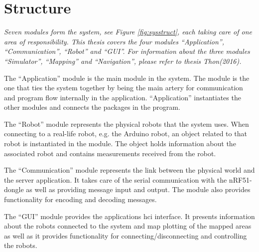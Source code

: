 \section{Structure}
\label{secr:structure}
\textit{Seven modules form the system, see Figure \ref{fig:sysstruct}, each taking care of one area of responsibility. This thesis covers the four modules ``Application'', ``Communication'', ``Robot'' and ``GUI''. For information about the three modules ``Simulator'', ``Mapping'' and ``Navigation'', please refer to thesis Thon(2016).}

The ``Application'' module is the main module in the system. The module is the one that ties the system together by being the main artery for communication and program flow internally in the application. ``Application'' instantiates the other modules and connects the packages in the program.

The ``Robot'' module represents the physical robots that the system uses. When connecting to a real-life robot, e.g. the Arduino robot, an object related to that robot is instantiated in the module. The object holds information about the associated robot and contains measurements received from the robot.

The ``Communication'' module represents the link between the physical world and the server application. It takes care of the serial communication with the nRF51-dongle as well as providing message input and output. The module also provides functionality for encoding and decoding messages.

The ``GUI'' module provides the applications \acrshort{hci} interface. It presents information about the robots connected to the system and map plotting of the mapped areas as well as it provides functionality for connecting/disconnecting and controlling the robots.

